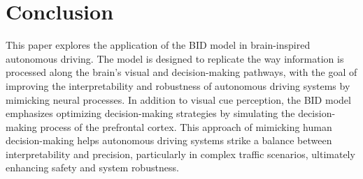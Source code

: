 \section{Conclusion}
\label{sec:conclusion}
\hspace{1pc}This paper explores the application of the BID model in brain-inspired autonomous driving. 
The model is designed to replicate the way information is processed along the brain’s visual and decision-making pathways, with the goal of improving the interpretability and robustness of autonomous driving systems by mimicking neural processes. 
In addition to visual cue perception, the BID model emphasizes optimizing decision-making strategies by simulating the decision-making process of the prefrontal cortex. 
This approach of mimicking human decision-making helps autonomous driving systems strike a balance between interpretability and precision, particularly in complex traffic scenarios, ultimately enhancing safety and system robustness.
